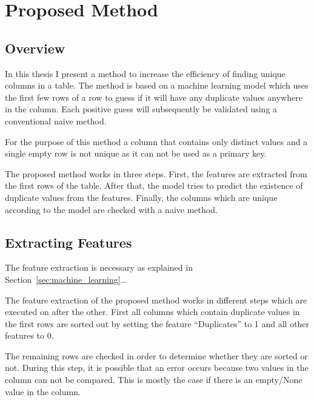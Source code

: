 \chapter{Proposed Method}\label{chap:proposed_method}
\section{Overview}\label{sec:overview}
In this thesis I present a method to increase the efficiency of finding unique columns in a table. The method is based on a machine learning model which uses the first few rows of a row to guess if it will have any duplicate values anywhere in the column. Each positive guess will subsequently be validated using a conventional naive method. %

For the purpose of this method a column that contains only distinct values and a single empty row is not unique as it can not be used as a primary key. %

The proposed method works in three steps. First, the features are extracted from the first rows of the table. After that, the model tries to predict the existence of duplicate values from the features. Finally, the columns which are unique according to the model are checked with a naive method.

\section{Extracting Features}\label{sec:extracted_features} %
The feature extraction is necessary as explained in Section~\ref{sec:machine_learning}\ldots %

The feature extraction of the proposed method works in different steps which are executed on after the other. First all columns which contain duplicate values in the first rows are sorted out by setting the feature \enquote{Duplicates} to \num{1} and all other features to \num{0}.

The remaining rows are checked in order to determine whether they are sorted or not. During this step, it is possible that an error occurs because two values in the column can not be compared. This is mostly the case if there is an empty/None value in the column.

